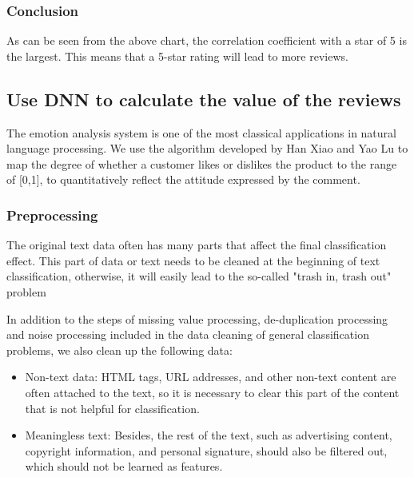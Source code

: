 \documentclass{mcmthesis}
\begin{document}
	\subsubsection{Conclusion}
	
	As can be seen from the above chart, the correlation coefficient with a star of 5 is the largest. This means that a 5-star rating will lead to more reviews.
	
	\subsection{Use DNN to calculate the value of the reviews}
	The emotion analysis system is one of the most classical applications in natural language processing. We use the algorithm developed by Han Xiao and Yao Lu\cite{1} to map the degree of whether a customer likes or dislikes the product to the range of [0,1], to quantitatively reflect the attitude expressed by the comment.
	\subsubsection{Preprocessing}
	
	
	The original text data often has many parts that affect the final classification effect. This part of data or text needs to be cleaned at the beginning of text classification, otherwise, it will easily lead to the so-called "trash in, trash out" problem\cite{2}
	
	In addition to the steps of missing value processing, de-duplication processing and noise processing included in the data cleaning of general classification problems, we also clean up the following data:
	\begin{itemize}
		\item Non-text data: HTML tags, URL addresses, and other non-text content are often attached to the text, so it is necessary to clear this part of the content that is not helpful for classification.
		\item Meaningless text: Besides, the rest of the text, such as advertising content, copyright information, and personal signature, should also be filtered out, which should not be learned as features.
	\end{itemize}
\end{document}

